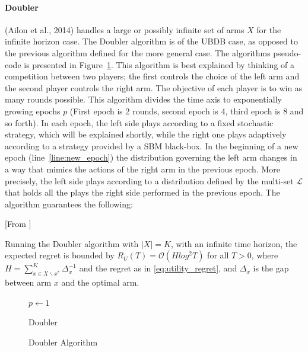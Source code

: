 \documentclass{llncs}
\begin{document}
	\paragraph{Doubler}
	(Ailon et al., 2014) handles a large or possibly infinite set of arms $X$ for the infinite horizon case.
	The Doubler algorithm is of the UBDB case, as opposed to the previous algorithm defined for the more general case.
	The algorithms pseudo-code is presented in Figure~\ref{algo_Doubler}.
	This algorithm is best explained by thinking of a competition between two players; the first controls the choice of the left arm and the second player controls the right arm. 
	The objective of each player is to win as many rounds possible.
	This algorithm divides the time axis to exponentially growing epochs  $p$ (First epoch is 2 rounds, second epoch is 4, third epoch is 8 and so forth).
	In each epoch, the left side plays according to a fixed stochastic strategy, which will be explained shortly, while the right one plays adaptively according to a strategy provided by a SBM black-box.
	In the beginning of a new epoch (line~\ref{line:new_epoch}) the distribution governing the left arm changes in a way that mimics the actions of the right arm in the previous epoch.
	More precisely, the left side plays according to a distribution defined by the multi-set $\mathcal{L}$ that holds all the plays the right side performed in the previous epoch.
	The algorithm guarantees the following:
	\begin{theorem}\label{thm:Doubler}[From \cite{...}]

		Running the Doubler algorithm with $|X|=K$, with an infinite time horizon, the expected regret is bounded by $R_U(T) = \mathcal{O} \left(H log^2 T \right)$ for all $T>0$, where $H=\sum_{x\in X \backslash x^*}^K \Delta^{-1}_x$ and the regret as in \eqref{eq:utility_regret}, and $\Delta_x$ is the gap between arm $x$ and the optimal arm.

	\end{theorem}
	
	\begin{figure}[h]
	\IncMargin{1em}
		\begin{algorithm}[H]
		
		\BlankLine
		$p\leftarrow 1$\\
			\caption{Doubler}
		\end{algorithm}
		\caption{Doubler Algorithm}\label{algo_Doubler}
	\end{figure}
\end{document}
